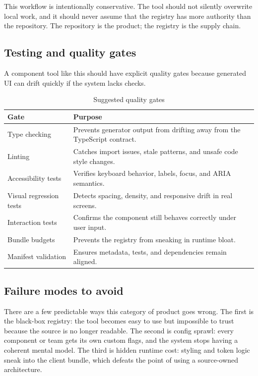 \documentclass[11pt,twoside,a4paper]{article}
\begin{document}
This workflow is intentionally conservative. The tool should not silently overwrite local work, and it should never assume that the registry has more authority than the repository. The repository is the product; the registry is the supply chain.

\subsection{Testing and quality gates}
A component tool like this should have explicit quality gates because generated UI can drift quickly if the system lacks checks.

\begin{table}[htbp]
  \centering
  \caption{Suggested quality gates}
  \begin{tabularx}{\textwidth}{@{}p{}Y@{}}
    \toprule
    \textbf{Gate} & \textbf{Purpose} \\
    \midrule
    Type checking & Prevents generator output from drifting away from the TypeScript contract. \\
    Linting & Catches import issues, stale patterns, and unsafe code style changes. \\
    Accessibility tests & Verifies keyboard behavior, labels, focus, and ARIA semantics. \\
    Visual regression tests & Detects spacing, density, and responsive drift in real screens. \\
    Interaction tests & Confirms the component still behaves correctly under user input. \\
    Bundle budgets & Prevents the registry from sneaking in runtime bloat. \\
    Manifest validation & Ensures metadata, tests, and dependencies remain aligned. \\
    \bottomrule
  \end{tabularx}
\end{table}

\subsection{Failure modes to avoid}
There are a few predictable ways this category of product goes wrong. The first is the black-box registry: the tool becomes easy to use but impossible to trust because the source is no longer readable. The second is config sprawl: every component or team gets its own custom flags, and the system stops having a coherent mental model. The third is hidden runtime cost: styling and token logic sneak into the client bundle, which defeats the point of using a source-owned architecture.
\end{document}
